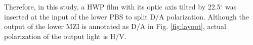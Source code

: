 \documentclass[letterpaper, 10pt]{article}
\begin{document}
Therefore, in this study, a HWP film with its optic axis tilted by 22.5$^\circ$ was inserted at the input of the lower PBS to split D/A polarization.
Although the output of the lower MZI is annotated as D/A in Fig. \ref{fig:layout}, actual polarization of the output light is H/V.

\end{document}
